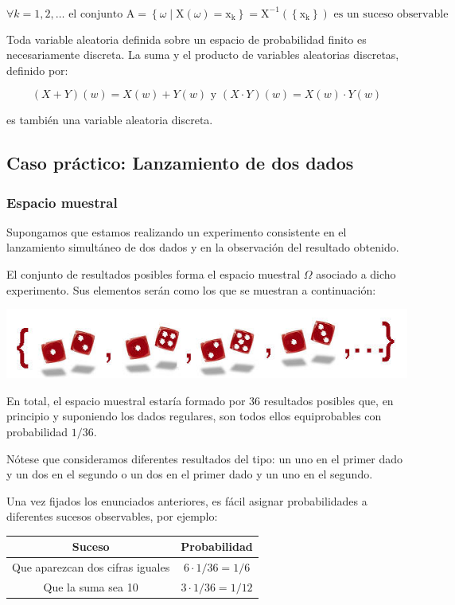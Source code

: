 \documentclass[
]{article}
\begin{document}
\[
\forall k=1,2, \ldots \text { el conjunto } \mathrm{A}=\left\{\omega \mid \mathrm{X}(\omega)=\mathrm{x}_{\mathrm{k}}\right\}=\mathrm{X}^{-1}\left(\left\{\mathrm{x}_{\mathrm{k}}\right\}\right) \text { es un suceso observable }
\]

Toda variable aleatoria definida sobre un espacio de probabilidad finito
es necesariamente discreta. La suma y el producto de variables
aleatorias discretas, definido por:

\[
(X+Y)(w)=X(w)+Y(w) \text { y }(X \cdot Y)(w)=X(w) \cdot Y(w)
\]

es también una variable aleatoria discreta.

\subsection{Caso práctico: Lanzamiento de dos dados}\label{caso-pruxe1ctico-lanzamiento-de-dos-dados}

\subsubsection{Espacio muestral}\label{espacio-muestral}

Supongamos que estamos realizando un experimento consistente en el lanzamiento simultáneo de dos dados y en la observación del resultado
obtenido.

El conjunto de resultados posibles forma el espacio muestral \(\Omega\) asociado a dicho experimento. Sus elementos serán como los que se
muestran a continuación:

\includegraphics{images/clipboard-1434716414.png}

En total, el espacio muestral estaría formado por 36 resultados posibles
que, en principio y suponiendo los dados regulares, son todos ellos
equiprobables con probabilidad \(1 / 36\).

Nótese que consideramos diferentes resultados del tipo: un uno en el
primer dado y un dos en el segundo o un dos en el primer dado y un uno
en el segundo.

Una vez fijados los enunciados anteriores, es fácil asignar
probabilidades a diferentes sucesos observables, por ejemplo:

\begin{longtable}[]{@{}cc@{}}
\toprule\noalign{}
Suceso & Probabilidad \\
\midrule\noalign{}
\endhead
\bottomrule\noalign{}
\endlastfoot
Que aparezcan dos cifras iguales & \(6 \cdot 1 / 36=1 / 6\) \\
Que la suma sea 10 & \(3 \cdot 1 / 36=1 / 12\) \\
\end{longtable}
\end{document}
